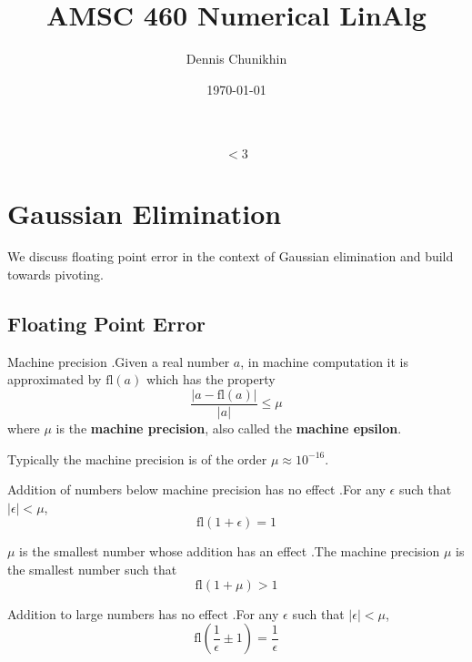 \documentclass[12pt,letterpaper]{article}
\title{AMSC 460 Numerical LinAlg}
\author{Dennis Chunikhin}
\date{\today}
\newcommand{\fl}{\mathrm{fl}}
\begin{document}
\maketitle

\[
<3
\]

\newpage

\tableofcontents

\newpage

\section{Gaussian Elimination}
We discuss floating point error in the context of Gaussian elimination and build towards pivoting.

\subsection{Floating Point Error}

\begin{defn}{Machine precision}
.Given a real number $a$, in machine computation it is approximated by $\fl(a)$ which has the property
\begin{equation}
	\frac{\left| a - \fl(a) \right|}{\left|a\right|} \leq \mu
\end{equation}
where $\mu$ is the \textbf{machine precision}, also called the \textbf{machine epsilon}.
\label{defn:machine_precision}
\end{defn}

Typically the machine precision is of the order $\mu \approx 10^{-16}$.

\begin{coro}{Addition of numbers below machine precision has no effect}
.For any $\epsilon$ such that $\left| \epsilon \right| < \mu$,
\begin{equation}
	\fl(1 + \epsilon) = 1
\end{equation}
\end{coro}

\begin{coro}{$\mu$ is the smallest number whose addition has an effect}
.The machine precision $\mu$ is the smallest number such that
\begin{equation}
	\fl(1 + \mu) > 1
\end{equation}
\end{coro}

\begin{coro}{Addition to large numbers has no effect}
.For any $\epsilon$ such that $\left| \epsilon \right| < \mu$,
\begin{equation}
	\fl\left(\frac{1}{\epsilon} \pm 1\right) = \frac{1}{\epsilon}
\end{equation}
\end{coro}
\end{document}
